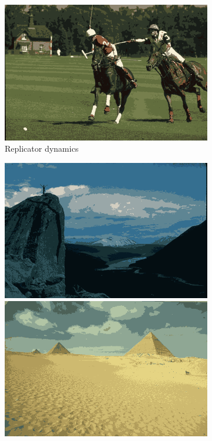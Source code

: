 \documentclass[11pt,a4paper]{article}
\begin{document}
\begin{figure}
\begin{subfigure}[b]{0.3\textwidth}
        \includegraphics[width=\textwidth]{figures/methods/rd/361010_avg.png}
        \caption{Replicator dynamics}
    \end{subfigure}
    \hfill
    \begin{subfigure}[b]{0.3\textwidth}
        \centering
        \includegraphics[width=\textwidth]{figures/methods/inimdyn/14037_avg.png}
        \includegraphics[width=\textwidth]{figures/methods/inimdyn/260058_avg.png}

\end{subfigure}
\end{figure}
\end{document}
